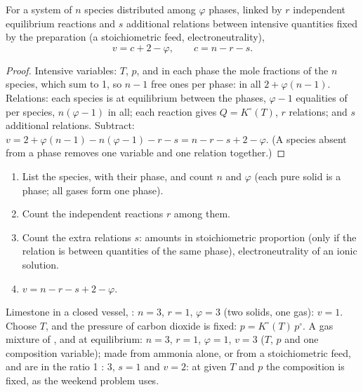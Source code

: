 \begin{theorem}\label{thm:b2:equilibrium-shifts:phase-rule}
For a system of $n$ species distributed among $\varphi$ phases, linked by $r$
independent equilibrium reactions and $s$ additional relations between
intensive quantities fixed by the preparation (a stoichiometric feed,
electroneutrality),
\[
  v = c + 2 - \varphi, \qquad c = n - r - s .
\]
\end{theorem}

\begin{proof}
Intensive variables: $T$, $p$, and in each phase the mole fractions of the
$n$ species, which sum to 1, so $n - 1$ free ones per phase: in all $2 +
\varphi(n - 1)$. Relations: each species is at equilibrium between the
phases, $\varphi - 1$ equalities of  per species, $n(\varphi -
1)$ in all; each reaction gives $Q = K^\circ(T)$, $r$ relations; and $s$
additional relations. Subtract: $v = 2 + \varphi(n - 1) - n(\varphi - 1) - r -
s = n - r - s + 2 - \varphi$. (A species absent from a phase removes one
variable and one relation together.)
\end{proof}

\begin{method}\label{met:b2:equilibrium-shifts:variance}
\begin{enumerate}
  \item List the species, with their phase, and count $n$ and $\varphi$
        (each pure solid is a phase; all gases form one phase).
  \item Count the independent reactions $r$ among them.
  \item Count the extra relations $s$: amounts in stoichiometric proportion
        (only if the relation is between quantities of the same phase),
        electroneutrality of an ionic solution.
  \item $v = n - r - s + 2 - \varphi$.
\end{enumerate}
\end{method}

\begin{example}\label{ex:b2:equilibrium-shifts:variances}
Limestone in a closed vessel, : $n = 3$, $r =
1$, $\varphi = 3$ (two solids, one gas): $v = 1$. Choose $T$, and the pressure
of carbon dioxide is fixed: $p = K^\circ(T)\,p^\circ$. A gas mixture of
,  and  at equilibrium: $n = 3$, $r = 1$, $\varphi = 1$, $v
= 3$ ($T$, $p$ and one composition variable); made from ammonia alone, or from
a stoichiometric feed,  and  are in the ratio 1 : 3, $s = 1$ and
$v = 2$: at given $T$ and $p$ the composition is fixed, as the weekend problem
uses.
\end{example}


